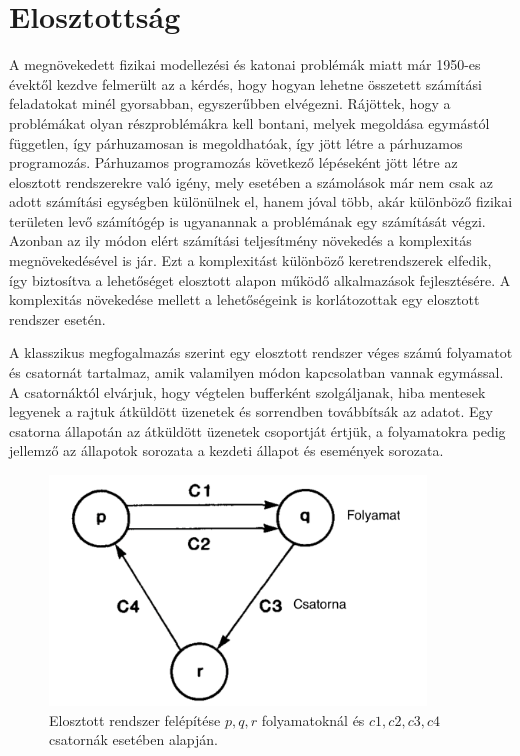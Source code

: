 \documentclass[a4paper,12pt]{article}
\begin{document}
\section{Elosztottság}
A megnövekedett fizikai modellezési és katonai problémák miatt már 1950-es évektől kezdve felmerült az a kérdés, hogy hogyan lehetne összetett számítási feladatokat minél gyorsabban, egyszerűbben elvégezni.\cite{cocke} Rájöttek, hogy a problémákat olyan részproblémákra kell bontani, melyek megoldása egymástól független, így párhuzamosan is megoldhatóak, így jött létre a párhuzamos programozás. \newline
Párhuzamos programozás következő lépéseként jött létre az elosztott rendszerekre való igény, mely esetében a számolások már nem csak az adott számítási egységben különülnek el, hanem jóval több, akár különböző fizikai területen levő számítógép is ugyanannak a problémának egy számítását végzi. Azonban az ily módon elért számítási teljesítmény növekedés a komplexitás megnövekedésével is jár. Ezt a komplexitást különböző keretrendszerek elfedik, így biztosítva a lehetőséget elosztott alapon működő alkalmazások fejlesztésére. A komplexitás növekedése mellett a lehetőségeink is korlátozottak egy elosztott rendszer esetén. \newline

A klasszikus megfogalmazás szerint\cite{chandy} egy elosztott rendszer véges számú folyamatot és csatornát tartalmaz, amik valamilyen módon kapcsolatban vannak egymással. A csatornáktól elvárjuk, hogy végtelen bufferként szolgáljanak, hiba mentesek legyenek a rajtuk átküldött üzenetek és sorrendben továbbítsák az adatot. Egy csatorna állapotán az átküldött üzenetek csoportját értjük, a folyamatokra pedig jellemző az állapotok sorozata a kezdeti állapot és események sorozata.

\begin{figure}[H]
\centering
\includegraphics[width=100mm]{img/distSys.png}
\caption{Elosztott rendszer felépítése $p, q, r$ folyamatoknál és $c1, c2, c3, c4$ csatornák esetében\cite{chandy} alapján.
\label{distSys}}
\end{figure}
\end{document}
